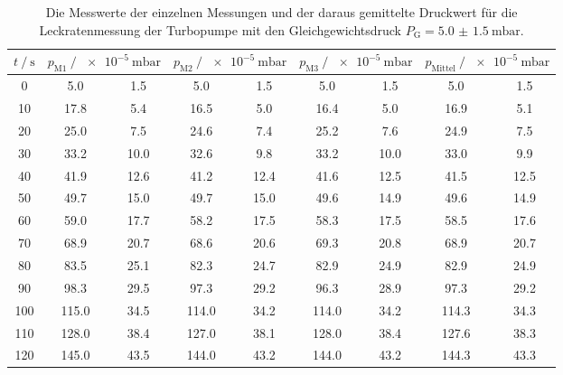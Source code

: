   \begin{table}[h]
    \centering
    \caption{Die Messwerte der einzelnen Messungen und der daraus gemittelte Druckwert für die Leckratenmessung der Turbopumpe mit den 
    Gleichgewichtsdruck $P_\text{G} = \SI{5.0(15)}{\milli\bar}$.}
    \label{tab:turbo_leck_5}
    \begin{tabular}{S[table-format=3.0] S @{${}\pm{}$} S[table-format=2.2] S @{${}\pm{}$} S[table-format=2.2] S @{${}\pm{}$} S[table-format=2.2] S @{${}\pm{}$} S[table-format=2.2]}
    \toprule
    {$t \mathbin{/} \si{\second} $} &  &  &  &  \\
     &    5.0 &  1.5 &   5.0 &  1.5 &   5.0 &  1.5 &   5.0 &  1.5 \\
     10 &   17.8 &  5.4 &  16.5 &  5.0 &  16.4 &  5.0 &  16.9 &  5.1 \\
     20 &   25.0 &  7.5 &  24.6 &  7.4 &  25.2 &  7.6 &  24.9 &  7.5 \\
     30 &   33.2 & 10.0 &  32.6 &  9.8 &  33.2 & 10.0 &  33.0 &  9.9 \\
     40 &   41.9 & 12.6 &  41.2 & 12.4 &  41.6 & 12.5 &  41.5 & 12.5 \\
     50 &   49.7 & 15.0 &  49.7 & 15.0 &  49.6 & 14.9 &  49.6 & 14.9 \\
     60 &   59.0 & 17.7 &  58.2 & 17.5 &  58.3 & 17.5 &  58.5 & 17.6 \\
     70 &   68.9 & 20.7 &  68.6 & 20.6 &  69.3 & 20.8 &  68.9 & 20.7 \\
     80 &   83.5 & 25.1 &  82.3 & 24.7 &  82.9 & 24.9 &  82.9 & 24.9 \\
     90 &   98.3 & 29.5 &  97.3 & 29.2 &  96.3 & 28.9 &  97.3 & 29.2 \\
    100 &  115.0 & 34.5 & 114.0 & 34.2 & 114.0 & 34.2 & 114.3 & 34.3 \\
    110 &  128.0 & 38.4 & 127.0 & 38.1 & 128.0 & 38.4 & 127.6 & 38.3 \\
    120 &  145.0 & 43.5 & 144.0 & 43.2 & 144.0 & 43.2 & 144.3 & 43.3 \\
    \bottomrule
    \end{tabular}
  \end{table}

